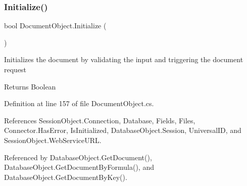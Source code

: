 \subsubsection{\texorpdfstring{Initialize()}{Initialize()}}
{\footnotesize\ttfamily bool Document\+Object.\+Initialize (\begin{DoxyParamCaption}{ }\end{DoxyParamCaption})}



Initializes the document by validating the input and triggering the document request 

\begin{DoxyReturn}{Returns}
Boolean
\end{DoxyReturn}


Definition at line 157 of file Document\+Object.\+cs.



References Session\+Object.\+Connection, Database, Fields, Files, Connector.\+Has\+Error, Is\+Initialized, Database\+Object.\+Session, Universal\+ID, and Session\+Object.\+Web\+Service\+U\+RL.



Referenced by Database\+Object.\+Get\+Document(), Database\+Object.\+Get\+Document\+By\+Formula(), and Database\+Object.\+Get\+Document\+By\+Key().


